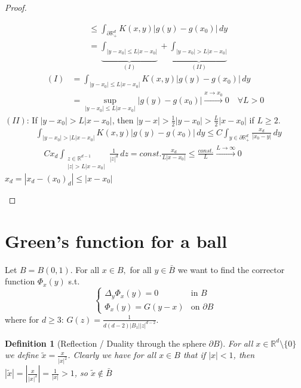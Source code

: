 \documentclass{report}
\theoremstyle{tommy}
\newtheorem{defn}{Definition}
\begin{document}
\begin{proof}
\begin{itemize}
\begin{align*}
        &\le \int_{\partial \mathbb{R}_+^d} K(x,y) |g(y)-g(x_0)| \, dy \\
        &= \underbrace{\int_{|y-x_0| \le L |x-x_0|}}_{(I)} + \underbrace{\int_{|y-x_0| > L|x-x_0|}}_{(II)}
      \end{align*}
      \begin{align*}
        (I) &= \int_{|y-x_0| \le L |x-x_0|} K(x,y) |g(y) - g(x_0)| \, dy \\
        &= \sup_{|y-x_0| \le L|x-x_0|} |g(y) - g(x_0)| \xrightarrow{x \to x_0} 0 \quad \forall L > 0
      \end{align*}
      \((II)\): If \(|y-x_0| > L|x-x_0|\), then \(|y-x| > \frac{1}{2} |y-x_0| > \frac{L}{2}|x-x_0|\) if \(L \ge 2\).
      \begin{align*}
        &\int_{|y-x_0| > |L|x-x_0|} K(x,y) |g(y) - g(x_0)| \, dy \le C \int_{y \in \partial \mathbb{R}_+^d} \frac{x_d}{|x_0-y|} \, dy \\
        &\quad C x_d \int_{\substack{z \in \mathbb{R}^{d-1}\\|z| > L|x-x_0|}} \frac{1}{|z|^d} \, dz = const. \frac{x_d}{L|x-x_0|} \le \frac{const.}{L} \xrightarrow{L \to \infty} 0
      \end{align*}
      \(x_d = |x_d - (x_0)_d| \le |x-x_0|\)
    \end{itemize}
  \end{proof}

  \section{Green's function for a ball}
  Let \(B = B(0,1)\). For all \(x \in B,\) for all \(y \in \bar B\) we want to find the corrector function \(\Phi_x(y)\) s.t.
  \[\begin{cases}
    \Delta_y \Phi_x(y) = 0 & \text{in } B \\
    \Phi_x(y) = G(y-x) & \text{on } \partial B
  \end{cases}\] 
  where for \(d \ge 3\): \(G(z) = \frac{1}{d(d-2)|B_1||z|^{d-2}}\).

  \begin{defn}[Reflection / Duality through the sphere \(\partial B\)]
    For all \(x \in \mathbb{R}^d \setminus \{0\}\) we define \(\tilde x = \frac{x}{|x|^2}\). Clearly we have for all \(x \in B\) that if \(|x| < 1\), then \(|\tilde x| = \left| \frac{x}{|x|^2}\right| = \frac{1}{|x|} > 1\), so \(\tilde x \notin \bar B\) 
  \end{defn}
\end{document}
